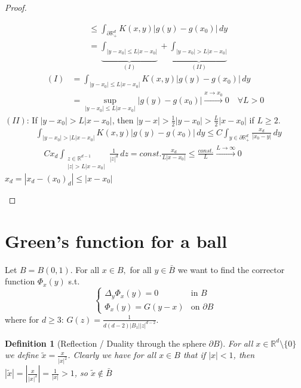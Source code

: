 \documentclass{report}
\theoremstyle{tommy}
\newtheorem{defn}{Definition}
\begin{document}
\begin{proof}
\begin{itemize}
\begin{align*}
        &\le \int_{\partial \mathbb{R}_+^d} K(x,y) |g(y)-g(x_0)| \, dy \\
        &= \underbrace{\int_{|y-x_0| \le L |x-x_0|}}_{(I)} + \underbrace{\int_{|y-x_0| > L|x-x_0|}}_{(II)}
      \end{align*}
      \begin{align*}
        (I) &= \int_{|y-x_0| \le L |x-x_0|} K(x,y) |g(y) - g(x_0)| \, dy \\
        &= \sup_{|y-x_0| \le L|x-x_0|} |g(y) - g(x_0)| \xrightarrow{x \to x_0} 0 \quad \forall L > 0
      \end{align*}
      \((II)\): If \(|y-x_0| > L|x-x_0|\), then \(|y-x| > \frac{1}{2} |y-x_0| > \frac{L}{2}|x-x_0|\) if \(L \ge 2\).
      \begin{align*}
        &\int_{|y-x_0| > |L|x-x_0|} K(x,y) |g(y) - g(x_0)| \, dy \le C \int_{y \in \partial \mathbb{R}_+^d} \frac{x_d}{|x_0-y|} \, dy \\
        &\quad C x_d \int_{\substack{z \in \mathbb{R}^{d-1}\\|z| > L|x-x_0|}} \frac{1}{|z|^d} \, dz = const. \frac{x_d}{L|x-x_0|} \le \frac{const.}{L} \xrightarrow{L \to \infty} 0
      \end{align*}
      \(x_d = |x_d - (x_0)_d| \le |x-x_0|\)
    \end{itemize}
  \end{proof}

  \section{Green's function for a ball}
  Let \(B = B(0,1)\). For all \(x \in B,\) for all \(y \in \bar B\) we want to find the corrector function \(\Phi_x(y)\) s.t.
  \[\begin{cases}
    \Delta_y \Phi_x(y) = 0 & \text{in } B \\
    \Phi_x(y) = G(y-x) & \text{on } \partial B
  \end{cases}\] 
  where for \(d \ge 3\): \(G(z) = \frac{1}{d(d-2)|B_1||z|^{d-2}}\).

  \begin{defn}[Reflection / Duality through the sphere \(\partial B\)]
    For all \(x \in \mathbb{R}^d \setminus \{0\}\) we define \(\tilde x = \frac{x}{|x|^2}\). Clearly we have for all \(x \in B\) that if \(|x| < 1\), then \(|\tilde x| = \left| \frac{x}{|x|^2}\right| = \frac{1}{|x|} > 1\), so \(\tilde x \notin \bar B\) 
  \end{defn}
\end{document}
